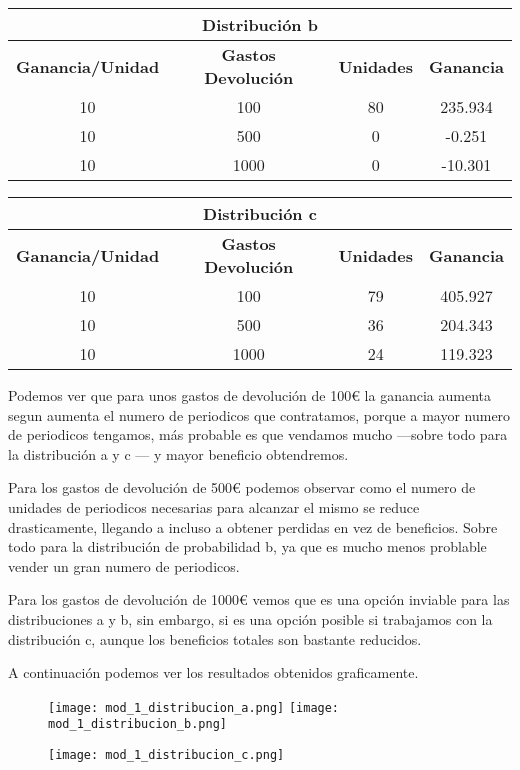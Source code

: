\begin{table}[H]
\centering
\begin{tabular}{|c|c|c|c|}
\hline
\multicolumn{4}{|c|}{\textbf{Distribución b}} \\ \hline
\textbf{Ganancia/Unidad} & \textbf{Gastos Devolución} & \textbf{Unidades} & \textbf{Ganancia} \\ \hline
10 & 100 & 80 & 235.934 \\
10 & 500 & 0 & -0.251 \\
10 & 1000 & 0 & -10.301 \\ \hline
\end{tabular}
\end{table}

\begin{table}[H]
\centering
\begin{tabular}{|c|c|c|c|}
\hline
\multicolumn{4}{|c|}{\textbf{Distribución c}} \\ \hline
\textbf{Ganancia/Unidad} & \textbf{Gastos Devolución} & \textbf{Unidades} & \textbf{Ganancia} \\ \hline
10 & 100 & 79 & 405.927 \\
10 & 500 & 36 & 204.343 \\
10 & 1000 & 24 & 119.323 \\ \hline
\end{tabular}
\end{table}

Podemos ver que para unos gastos de devolución de 100€ la ganancia aumenta segun aumenta el numero de periodicos que contratamos, porque a mayor numero de periodicos tengamos, más probable es que vendamos mucho ---sobre todo para la distribución a y c --- y mayor beneficio obtendremos.

Para los gastos de devolución de 500€ podemos observar como el numero de unidades de periodicos necesarias para alcanzar el mismo se reduce drasticamente, llegando a incluso a obtener perdidas en vez de beneficios. Sobre todo para la distribución de probabilidad b, ya que es mucho menos problable vender un gran numero de periodicos.

Para los gastos de devolución de 1000€ vemos que es una opción inviable para las distribuciones a y b, sin embargo, si es una opción posible si trabajamos con la distribución c, aunque los beneficios totales son bastante reducidos.

A continuación podemos ver los resultados obtenidos graficamente.

\begin{figure}[H]
	\centering
	\texttt{[image: mod\_1\_distribucion\_a.png]}
	\texttt{[image: mod\_1\_distribucion\_b.png]}
\end{figure}
\begin{figure}[H]
	\centering
	\texttt{[image: mod\_1\_distribucion\_c.png]}
\end{figure}

